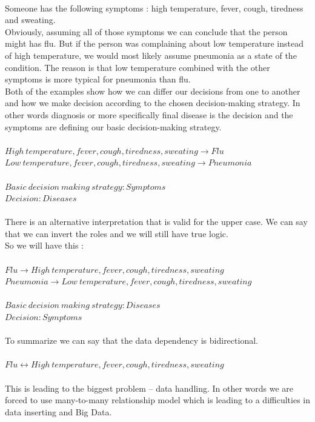 \paragraph{}
Someone has the following symptoms : high temperature, fever, cough, tiredness and sweating. \\
Obviously, assuming all of those symptoms we can conclude that the person might has flu. But if the person was complaining about low temperature instead of high temperature, we would most likely assume pneumonia as a state of the condition. The reason is that low temperature combined with the other symptoms is more typical for pneumonia than flu. \\
Both of the examples show how we can differ our decisions from one to another and how we make decision according to the chosen decision-making strategy. In other words diagnosis or more specifically final disease is the decision and the symptoms are defining our basic decision-making strategy.\\
\\
$High\ temperature, fever, cough, tiredness, sweating \rightarrow Flu$\\
$Low\ temperature, fever, cough, tiredness, sweating \rightarrow Pneumonia$\\
\\
$Basic\ decision\ making\ strategy : Symptoms$\\
$Decision : Diseases$\\
\\
There is an alternative interpretation that is valid for the upper case. 
We can say that we can invert the roles and we will still have true logic.\\  
So we will have this :\\
\\
$Flu \rightarrow High\ temperature, fever, cough, tiredness, sweating$\\
$Pneumonia \rightarrow Low\ temperature, fever, cough, tiredness, sweating$\\
\\
$Basic\ decision\ making\ strategy : Diseases$\\
$Decision : Symptoms$\\
\\
To summarize we can say that the data dependency is bidirectional.\\
\\
$Flu \leftrightarrow High\ temperature, fever, cough, tiredness, sweating$
\paragraph{}
This is leading to the biggest problem – data handling.
In other words  we are forced to use many-to-many relationship model which is leading to a difficulties in data inserting and Big Data.

